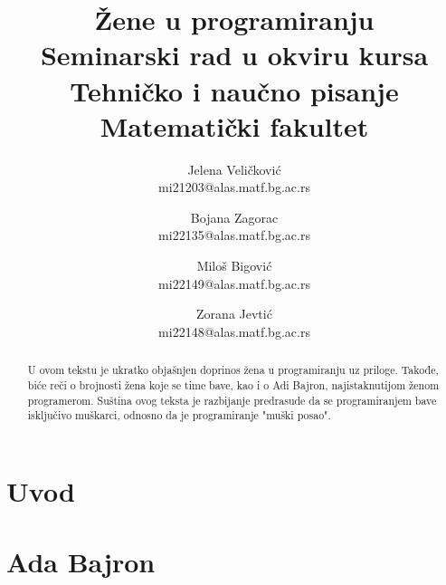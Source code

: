 \documentclass[a4paper,12pt]{article}
\begin{document}
\title{\textbf{Žene u programiranju\\} \small{Seminarski rad u okviru kursa\\Tehničko i naučno pisanje\\ Matematički fakultet}}

\author{Jelena Veličković\\ mi21203@alas.matf.bg.ac.rs \and Bojana Zagorac\\ mi22135@alas.matf.bg.ac.rs \and Miloš Bigović\\ mi22149@alas.matf.bg.ac.rs \and Zorana Jevtić\\ mi22148@alas.matf.bg.ac.rs}

\date{\textit{}}

\maketitle

\begin{abstract}
    U ovom tekstu je ukratko objašnjen doprinos žena u programiranju uz priloge. Takođe, biće reči o
    brojnosti žena koje se time bave, kao i o Adi Bajron, najistaknutijom ženom programerom. Suština 
    ovog teksta je razbijanje predrasude da se programiranjem bave isključivo muškarci, odnosno da je 
    programiranje "muški posao". 
\end{abstract}


\color{blue}\tableofcontents

\newpage
\color{black}\section{Uvod}

\newpage
\section{Ada Bajron}
\end{document}

